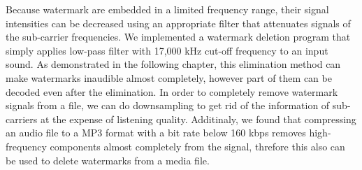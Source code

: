 Because watermark are embedded in a limited frequency range, their signal intensities can be decreased using an appropriate filter that attenuates signals of the sub-carrier frequencies.
We implemented a watermark deletion program that simply applies low-pass filter with 17,000 kHz cut-off frequency to an input sound.
As demonstrated in the following chapter, this elimination method can make watermarks inaudible almost completely, however part of them can be decoded even after the elimination.
In order to completely remove watermark signals from a file, we can do downsampling to get rid of the information of sub-carriers at the expense of listening quality.
Additinaly, we found that compressing an audio file to a MP3 format with a bit rate below 160 kbps removes high-frequency components almost completely from the signal, threfore this also can be used to delete watermarks from a media file.
